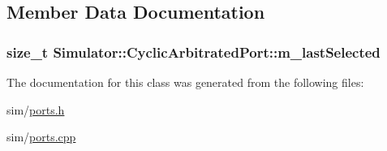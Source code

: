 \subsection{Member Data Documentation}
\hypertarget{class_simulator_1_1_cyclic_arbitrated_port_af90afe3374d413eeb1425ec0bd293677}{
\subsubsection[{m\+\_\+last\+Selected}]{\setlength{\rightskip}{0pt plus 5cm}size\+\_\+t Simulator\+::\+Cyclic\+Arbitrated\+Port\+::m\+\_\+last\+Selected\hspace{0.3cm}{\ttfamily [protected]}}}\label{class_simulator_1_1_cyclic_arbitrated_port_af90afe3374d413eeb1425ec0bd293677}


The documentation for this class was generated from the following files\+:\begin{DoxyCompactItemize}
\item 
sim/\hyperlink{ports_8h}{ports.\+h}\item 
sim/\hyperlink{ports_8cpp}{ports.\+cpp}\end{DoxyCompactItemize}
